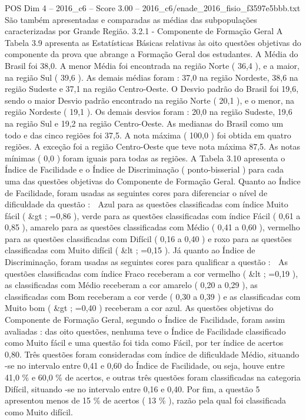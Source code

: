 \begin{textsample}{POS Dim 4 – 2016\_c6 – Score 3.00 – 2016\_c6/enade\_2016\_fisio\_f3597e5bbb.txt}
São também apresentadas e comparadas as médias das subpopulações caracterizadas por Grande Região. 3.2.1 - Componente de Formação Geral A Tabela 3.9 apresenta as Estatísticas Básicas relativas às oito questões objetivas do componente da prova que abrange a Formação Geral dos estudantes.
A Média do Brasil foi 38,0.
A menor Média foi encontrada na região Norte ( 36,4 ), e a maior, na região Sul ( 39,6 ).
As demais médias foram : 37,0 na região Nordeste, 38,6 na região Sudeste e 37,1 na região Centro-Oeste.
O Desvio padrão do Brasil foi 19,6, sendo o maior Desvio padrão encontrado na região Norte ( 20,1 ), e o menor, na região Nordeste ( 19,1 ).
Os demais desvios foram : 20,0 na região Sudeste, 19,6 na região Sul e 19,2 na região Centro-Oeste.
As medianas do Brasil como um todo e das cinco regiões foi 37,5.
A nota máxima ( 100,0 ) foi obtida em quatro regiões.
A exceção foi a região Centro-Oeste que teve nota máxima 87,5.
As notas mínimas ( 0,0 ) foram iguais para todas as regiões.
A Tabela 3.10 apresenta o Índice de Facilidade e o Índice de Discriminação ( ponto-bisserial ) para cada uma das questões objetivas do Componente de Formação Geral.
Quanto ao Índice de Facilidade, foram usadas as seguintes cores para diferenciar o nível de dificuldade da questão :  Azul para as questões classificadas com índice Muito fácil ( \&gt ; =0,86 ), verde para as questões classificadas com índice Fácil ( 0,61 a 0,85 ), amarelo para as questões classificadas com Médio ( 0,41 a 0,60 ), vermelho para as questões classificadas com Difícil ( 0,16 a 0,40 ) e roxo para as questões classificadas com Muito difícil ( \&lt ; =0,15 ).
Já quanto ao Índice de Discriminação, foram usadas as seguintes cores para qualificar a questão :  As questões classificadas com índice Fraco receberam a cor vermelho ( \&lt ; =0,19 ), as classificadas com Médio receberam a cor amarelo ( 0,20 a 0,29 ), as classificadas com Bom receberam a cor verde ( 0,30 a 0,39 ) e as classificadas com Muito bom ( \&gt ; =0,40 ) receberam a cor azul.
As questões objetivas do Componente de Formação Geral, segundo o Índice de Facilidade, foram assim avaliadas : das oito questões, nenhuma teve o Índice de Facilidade classificado como Muito fácil e uma questão foi tida como Fácil, por ter índice de acertos 0,80.
Três questões foram consideradas com índice de dificuldade Médio, situando -se no intervalo entre 0,41 e 0,60 do Índice de Facilidade, ou seja, houve entre 41,0 \% e 60,0 \% de acertos, e outras três questões foram classificadas na categoria Difícil, situando -se no intervalo entre 0,16 e 0,40.
Por fim, a questão 5 apresentou menos de 15 \% de acertos ( 13 \% ), razão pela qual foi classificada como Muito difícil.

\end{textsample}
